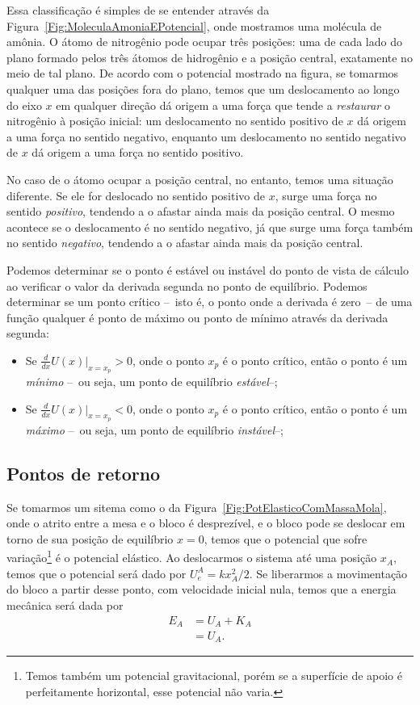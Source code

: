 Essa classificação é simples de se entender através da Figura~\ref{Fig:MoleculaAmoniaEPotencial}, onde mostramos uma molécula de amônia. O átomo de nitrogênio pode ocupar três posições: uma de cada lado do plano formado pelos três átomos de hidrogênio e a posição central, exatamente no meio de tal plano. De acordo com o potencial mostrado na figura, se tomarmos qualquer uma das posições fora do plano, temos que um deslocamento ao longo do eixo $x$ em qualquer direção dá origem a uma força que tende a \emph{restaurar} o nitrogênio à posição inicial: um deslocamento no sentido positivo de $x$ dá origem a uma força no sentido negativo, enquanto um deslocamento no sentido negativo de $x$ dá origem a uma força no sentido positivo.

No caso de o átomo ocupar a posição central, no entanto, temos uma situação diferente. Se ele for deslocado no sentido positivo de $x$, surge uma força no sentido \emph{positivo}, tendendo a o afastar ainda mais da posição central. O mesmo acontece se o deslocamento é no sentido negativo, já que surge uma força também no sentido \emph{negativo}, tendendo a o afastar ainda mais da posição central.

Podemos determinar se o ponto é estável ou instável do ponto de vista de cálculo ao verificar o valor da derivada segunda no ponto de equilíbrio. Podemos determinar se um ponto crítico --~isto é, o ponto onde a derivada é zero~-- de uma função qualquer é ponto de máximo ou ponto de mínimo através da derivada segunda:
\begin{itemize}
    \item Se $\frac{d}{dx}U(x)|_{x = x_p} > 0$, onde o ponto $x_p$ é o ponto crítico, então o ponto é um \emph{mínimo} --~ou seja, um ponto de equilíbrio \emph{estável}--;
    \item Se $\frac{d}{dx}U(x)|_{x = x_p} < 0$, onde o ponto $x_p$ é o ponto crítico, então o ponto é um \emph{máximo} --~ou seja, um ponto de equilíbrio \emph{instável}--;
\end{itemize}

\subsection{Pontos de retorno}

Se tomarmos um sitema como o da Figura~\ref{Fig:PotElasticoComMassaMola}, onde o atrito entre a mesa e o bloco é desprezível, e o bloco pode se deslocar em torno de sua posição de equilíbrio $x = 0$, temos que o potencial que sofre variação\footnote{Temos também um potencial gravitacional, porém se a superfície de apoio é perfeitamente horizontal, esse potencial não varia.} é o potencial elástico. Ao deslocarmos o sistema até uma posição $x_A$, temos que o potencial será dado por $U_e^A = kx_A^2 /2$. Se liberarmos a movimentação do bloco a partir desse ponto, com velocidade inicial nula, temos que a energia mecânica será dada por
\begin{align}
  E_A &= U_A + K_A \\
  &= U_A.
\end{align}

